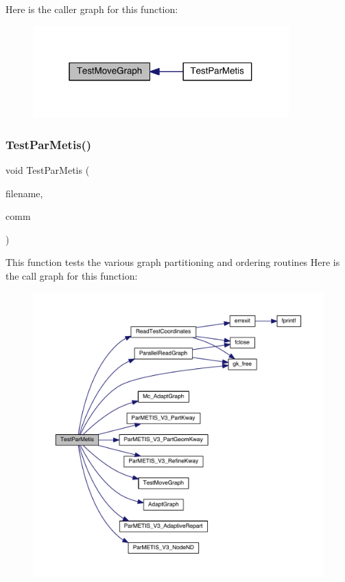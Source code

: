 Here is the caller graph for this function\+:\nopagebreak
\begin{figure}[H]
\begin{center}
\leavevmode
\includegraphics[width=280pt]{a00428_a136ad3b21ef4f877c3100a997814e8ce_icgraph}
\end{center}
\end{figure}
\mbox{\label{a00428_ac0ca0065f1dc35b0f4fe4d1968313dca}} 
\subsubsection{\texorpdfstring{Test\+Par\+Metis()}{TestParMetis()}}
{\footnotesize\ttfamily void Test\+Par\+Metis (\begin{DoxyParamCaption}\item[{char $\ast$}]{filename,  }\item[{M\+P\+I\+\_\+\+Comm}]{comm }\end{DoxyParamCaption})}

This function tests the various graph partitioning and ordering routines Here is the call graph for this function\+:\nopagebreak
\begin{figure}[H]
\begin{center}
\leavevmode
\includegraphics[width=350pt]{a00428_ac0ca0065f1dc35b0f4fe4d1968313dca_cgraph}
\end{center}
\end{figure}
